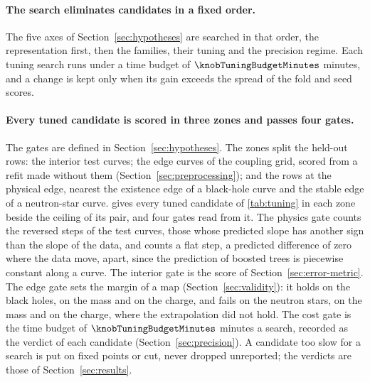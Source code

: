 \paragraph{The search eliminates candidates in a fixed order.}
The five axes of Section~\ref{sec:hypotheses} are searched in that order, the representation first, then the families, their tuning and the precision regime. Each tuning search runs under a time budget of $\knobTuningBudgetMinutes$ minutes, and a change is kept only when its gain exceeds the spread of the fold and seed scores.

\paragraph{Every tuned candidate is scored in three zones and passes four gates.}
The gates are defined in Section~\ref{sec:hypotheses}. The zones split the held-out rows: the interior test curves; the edge curves of the coupling grid, scored from a refit made without them (Section~\ref{sec:preprocessing}); and the rows at the physical edge, nearest the existence edge of a black-hole curve and the stable edge of a neutron-star curve.  gives every tuned candidate of \cref{tab:tuning} in each zone beside the ceiling of its pair, and four gates read from it. The physics gate counts the reversed steps of the test curves, those whose predicted slope has another sign than the slope of the data, and counts a flat step, a predicted difference of zero where the data move, apart, since the prediction of boosted trees is piecewise constant along a curve. The interior gate is the score of Section~\ref{sec:error-metric}. The edge gate sets the margin of a map (Section~\ref{sec:validity}): it holds on the black holes, \zoneBhMassMargin{} on the mass and \zoneBhChargeMargin{} on the charge, and fails on the neutron stars, \zoneNsMassMargin{} on the mass and \zoneNsChargeMargin{} on the charge, where the extrapolation did not hold. The cost gate is the time budget of $\knobTuningBudgetMinutes$ minutes a search, recorded as the verdict of each candidate (Section~\ref{sec:precision}). A candidate too slow for a search is put on fixed points or cut, never dropped unreported; the verdicts are those of Section~\ref{sec:results}.
